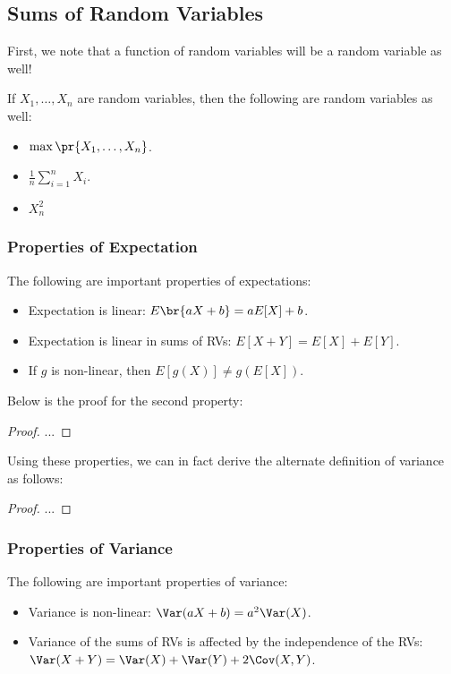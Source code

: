 \documentclass[openany]{book}
\begin{document}
\subsection{Sums of Random Variables}
First, we note that a function of random variables will be a random variable as well!
\begin{example}
	If $X_1, \ldots, X_n$ are random variables, then the following are random variables as well:
	\begin{itemize}
		\item $\max\pr{X_1, \ldots, X_n}$.
		\item $\frac{1}{n} \sum_{i=1}^{n} X_i$.
		\item $X_n^{2}$
	\end{itemize}
\end{example}

\subsubsection{Properties of Expectation}
The following are important properties of expectations:
\begin{itemize}
	\item Expectation is linear: $E\br{aX + b} = aE[X] + b$.
	\item Expectation is linear in sums of RVs: $E[X+Y] = E[X] + E[Y]$.
	\item If $g$ is non-linear, then $E[g(X)] \neq g(E[X])$.
\end{itemize}

Below is the proof for the second property:
\begin{proof}
	...
\end{proof}

Using these properties, we can in fact derive the alternate definition of variance as follows:
\begin{proof}
	...
\end{proof}

\subsubsection{Properties of Variance}
The following are important properties of variance:
\begin{itemize}
	\item Variance is non-linear: $\Var(aX + b) = a^{2}\Var(X)$.
	\item Variance of the sums of RVs is affected by the independence of the RVs: $\Var(X + Y) = \Var(X) + \Var(Y) + 2\Cov(X,Y)$.
\end{itemize}
\end{document}

